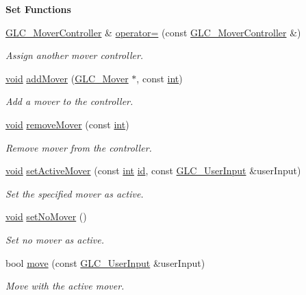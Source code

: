\begin{Indent}{\bf Set Functions}\par
\begin{DoxyCompactItemize}
\item 
\hyperlink{class_g_l_c___mover_controller}{G\-L\-C\-\_\-\-Mover\-Controller} \& \hyperlink{class_g_l_c___mover_controller_ae9d90dc77f8b77af5fbacda94581a870}{operator=} (const \hyperlink{class_g_l_c___mover_controller}{G\-L\-C\-\_\-\-Mover\-Controller} \&)
\begin{DoxyCompactList}\small\item\em Assign another mover controller. \end{DoxyCompactList}\item 
\hyperlink{group___u_a_v_objects_plugin_ga444cf2ff3f0ecbe028adce838d373f5c}{void} \hyperlink{class_g_l_c___mover_controller_ab241961299649b1d7c6f24a2e6d1d517}{add\-Mover} (\hyperlink{class_g_l_c___mover}{G\-L\-C\-\_\-\-Mover} $\ast$, const \hyperlink{ioapi_8h_a787fa3cf048117ba7123753c1e74fcd6}{int})
\begin{DoxyCompactList}\small\item\em Add a mover to the controller. \end{DoxyCompactList}\item 
\hyperlink{group___u_a_v_objects_plugin_ga444cf2ff3f0ecbe028adce838d373f5c}{void} \hyperlink{class_g_l_c___mover_controller_a78bd0b471b4b2c7ab632bf8c5fc20997}{remove\-Mover} (const \hyperlink{ioapi_8h_a787fa3cf048117ba7123753c1e74fcd6}{int})
\begin{DoxyCompactList}\small\item\em Remove mover from the controller. \end{DoxyCompactList}\item 
\hyperlink{group___u_a_v_objects_plugin_ga444cf2ff3f0ecbe028adce838d373f5c}{void} \hyperlink{class_g_l_c___mover_controller_a6306d26b7f96d0d03dbb75ce0d6b9345}{set\-Active\-Mover} (const \hyperlink{ioapi_8h_a787fa3cf048117ba7123753c1e74fcd6}{int} \hyperlink{glext_8h_a58c2a664503e14ffb8f21012aabff3e9}{id}, const \hyperlink{class_g_l_c___user_input}{G\-L\-C\-\_\-\-User\-Input} \&user\-Input)
\begin{DoxyCompactList}\small\item\em Set the specified mover as active. \end{DoxyCompactList}\item 
\hyperlink{group___u_a_v_objects_plugin_ga444cf2ff3f0ecbe028adce838d373f5c}{void} \hyperlink{class_g_l_c___mover_controller_aeea410704b83d1ea434bf021f1f1f1e7}{set\-No\-Mover} ()
\begin{DoxyCompactList}\small\item\em Set no mover as active. \end{DoxyCompactList}\item 
bool \hyperlink{class_g_l_c___mover_controller_a9e0902a621568c728871a69fbeb7fcde}{move} (const \hyperlink{class_g_l_c___user_input}{G\-L\-C\-\_\-\-User\-Input} \&user\-Input)
\begin{DoxyCompactList}\small\item\em Move with the active mover. \end{DoxyCompactList}\end{DoxyCompactItemize}
\end{Indent}
